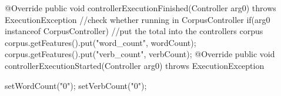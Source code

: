 {{	}
	@Override
	public void controllerExecutionFinished(Controller arg0)
			throws ExecutionException {
		//check whether running in CorpusController
		if(arg0 instanceof CorpusController){
			//put the total into the controllers corpus
			corpus.getFeatures().put("word_count", wordCount);
			corpus.getFeatures().put("verb_count", verbCount);
		}
	}
	@Override
	public void controllerExecutionStarted(Controller arg0)
			throws ExecutionException {
		setWordCount("0");
		setVerbCount("0");
		
	}
	
	
}
